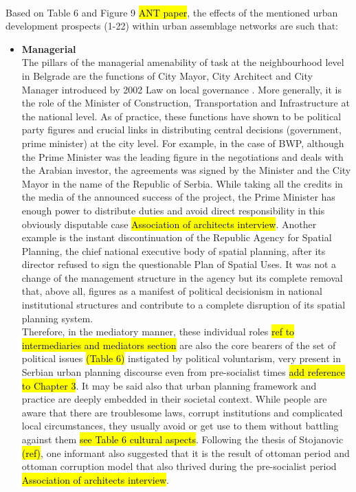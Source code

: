 \documentclass[11pt]{report}
\begin{document}
\\
Based on Table 6 and Figure 9 \hl{ANT paper}, the effects of the mentioned urban development prospects (1-22) within urban assemblage networks are such that:
\begin{itemize}
\item \textbf{Managerial}
\\
The pillars of the managerial amenability of task at the neighbourhood level in Belgrade are the functions of City Mayor, City Architect and City Manager introduced by 2002 Law on local governance \cite{Vujovic and Petrovic 2007}. More generally, it is the role of the Minister of Construction, Transportation and Infrastructure at the national level. As of practice, these functions have shown to be political party figures and crucial links in distributing central decisions (government, prime minister) at the city level.
For example, in the case of BWP, although the Prime Minister was the leading figure in the negotiations and deals with the Arabian investor, the agreements was signed by the Minister and the City Mayor in the name of the Republic of Serbia. While taking all the credits in the media of the announced success of the project, the Prime Minister has enough power to distribute duties and avoid direct responsibility in this obviously disputable case \hl{Association of architects interview}.
Another example is the instant discontinuation of the Republic Agency for Spatial Planning, the chief national executive body of spatial planning, after its director refused to sign the questionable Plan of Spatial Uses. It was not a change of the management structure in the agency but its complete removal that, above all, figures as a manifest of political decisionism in national institutional structures and contribute to a complete disruption of its spatial planning system.\footnotemark
{}
\\
Therefore, in the mediatory manner, these individual roles \hl{ref to intermediaries and mediators section} are also the core bearers of the set of political issues \hl{(Table 6)} instigated by political voluntarism, very present in Serbian urban planning discourse even from pre-socialist times \hl{add reference to Chapter 3}.
It may be said also that urban planning framework and practice are deeply embedded in their societal context.
While people are aware that there are troublesome laws, corrupt institutions and complicated local circumstances, they usually avoid or get use to them without battling against them \hl{see Table 6 cultural aspects}. Following the thesis of Stojanovic \hl{(ref)}, one informant also suggested that it is the result of ottoman period and ottoman corruption model that also thrived during the pre-socialist period \hl{Association of architects  interview}.


\end{itemize}
\end{document}
